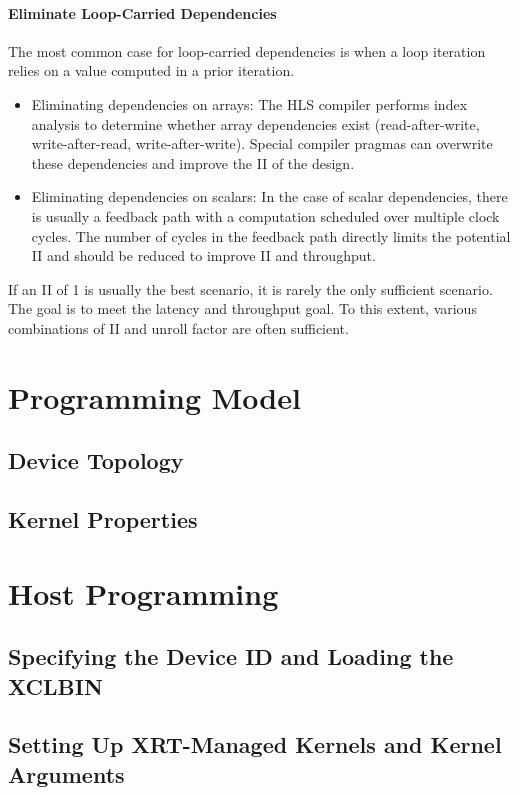 \paragraph{Eliminate Loop-Carried Dependencies}
The most common case for loop-carried dependencies is when a loop iteration relies on a value computed in a prior iteration.

\begin{itemize}
    \item Eliminating dependencies on arrays: The HLS compiler performs index analysis to determine whether array dependencies exist (read-after-write, write-after-read, write-after-write). Special compiler pragmas can overwrite these dependencies and improve the II of the design.
    \item Eliminating dependencies on scalars: In the case of scalar dependencies, there is usually a feedback path with a computation scheduled over multiple clock cycles. The number of cycles in the feedback path directly limits the potential II and should be reduced to improve II and throughput. 
\end{itemize}

If an II of 1 is usually the best scenario, it is rarely the only sufficient scenario. The goal is to meet the latency and throughput goal. To this extent, various combinations of II and unroll factor are
often sufficient.


\section{Programming Model}
\subsection{Device Topology}
\subsection{Kernel Properties}


\section{Host Programming}
\subsection{Specifying the Device ID and Loading the XCLBIN}
\subsection{Setting Up XRT-Managed Kernels and Kernel Arguments}
